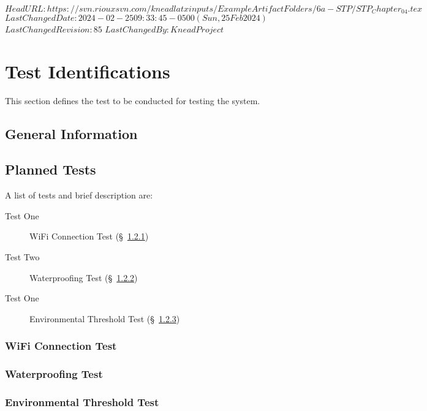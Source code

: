 \svnidlong
{$HeadURL: https://svn.riouxsvn.com/kneadlatxinputs/ExampleArtifactFolders/6a-STP/STP_Chapter_04.tex $}
{$LastChangedDate: 2024-02-25 09:33:45 -0500 (Sun, 25 Feb 2024) $}
{$LastChangedRevision: 85 $}
{$LastChangedBy: KneadProject $}


\chapter{Test Identifications}
\label{loc:TestIdentifications}
% 

This section defines the test to be conducted for testing the system.

\section{General Information}
\label{loc:TestGeneralInformation}



\section{Planned Tests}
\label{loc:TestGeneralInformation}
% 

A list of tests and brief description are:
\begin{description}
\item [Test One] WiFi Connection Test (\S~\ref{loc:TestIdOne})
\item [Test Two] Waterproofing Test (\S~\ref{loc:TestIdTwo})
\item [Test One] Environmental Threshold Test (\S~\ref{loc:TestIdThree})
\end{description}

\subsection{WiFi Connection Test}
\label{loc:TestIdOne}
\newcommand{\TestIdName}{WiFi Test}%


\subsection{Waterproofing Test}
\label{loc:TestIdTwo}
\renewcommand{\TestIdName}{Waterproofing Test}%


\subsection{Environmental Threshold Test}
\label{loc:TestIdThree}
\renewcommand{\TestIdName}{Environmental Threshold Test}%


